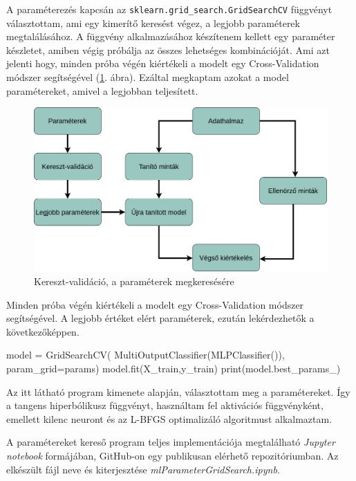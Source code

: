 A paraméterezés kapcsán az \texttt{sklearn.grid\_search.GridSearchCV} függvényt választottam, ami egy kimerítő keresést végez, a legjobb paraméterek megtalálásához. A függvény alkalmazásához készítenem kellett egy paraméter készletet, amiben végig próbálja az összes lehetséges kombinációját. Ami azt jelenti hogy, minden próba végén kiértékeli a modelt egy Cross-Validation módszer segítségével (\ref{fig:cross-validation}. ábra). Ezáltal megkaptam azokat a model paramétereket, amivel a legjobban teljesített.
\begin{figure}[h!]
\centering
\includegraphics[scale=0.3]{images/gridSearch.png}
\caption{Kereszt-validáció, a paraméterek megkeresésére}
\label{fig:cross-validation}
\end{figure}

Minden próba végén kiértékeli a modelt egy Cross-Validation módszer segítségével. A legjobb értéket elért paraméterek, ezután lekérdezhetők a következőképpen.

\begin{python}
model = GridSearchCV(
    MultiOutputClassifier(MLPClassifier()), param_grid=params)
model.fit(X_train,y_train)
print(model.best_params_)
\end{python} 

Az itt látható program kimenete alapján, választottam meg a paramétereket.
Így a tangens hiperbólikusz függvényt, használtam fel aktivációs függvényként, emellett kilenc neuront és az L-BFGS optimalizáló algoritmust alkalmaztam.

A paramétereket kereső program teljes implementációja megtalálható \textit{Jupyter notebook} formájában, GitHub-on egy publikusan elérhető repozitóriumban. Az elkészült fájl neve és kiterjesztése \textit{mlParameterGridSearch.ipynb}.

